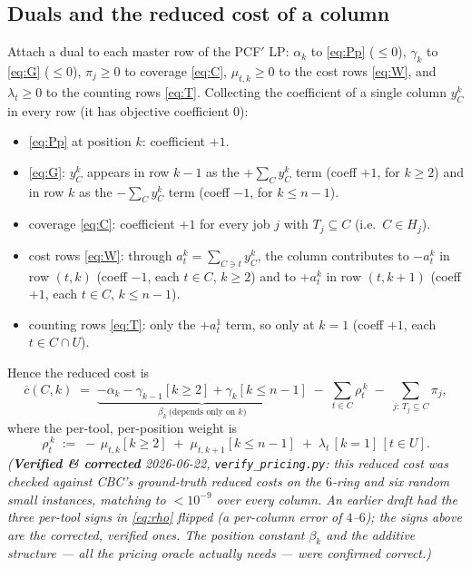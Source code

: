 \documentclass[11pt,a4paper]{article}
\theoremstyle{plain}
\theoremstyle{definition}
\newcommand{\RC}{\overline{c}}
\begin{document}
\subsection{Duals and the reduced cost of a column}
Attach a dual to each master row of the PCF$'$ LP: $\alpha_k$ to \eqref{eq:Pp} ($\le0$),
$\gamma_k$ to \eqref{eq:G} ($\le0$), $\pi_j\ge0$ to coverage \eqref{eq:C}, $\mu_{t,k}\ge0$ to the
cost rows \eqref{eq:W}, and $\lambda_t\ge0$ to the counting rows \eqref{eq:T}. Collecting the
coefficient of a single column $y_C^k$ in every row (it has objective coefficient $0$):
\begin{itemize}
\item \eqref{eq:Pp} at position $k$: coefficient $+1$.
\item \eqref{eq:G}: $y_C^k$ appears in row $k{-}1$ as the $+\sum_C y_C^k$ term (coeff $+1$, for
      $k\ge2$) and in row $k$ as the $-\sum_C y_C^k$ term (coeff $-1$, for $k\le n-1$).
\item coverage \eqref{eq:C}: coefficient $+1$ for every job $j$ with $T_j\subseteq C$ (i.e.\
      $C\in H_j$).
\item cost rows \eqref{eq:W}: through $a_t^k=\sum_{C\ni t}y_C^k$, the column contributes to
      $-a_t^k$ in row $(t,k)$ (coeff $-1$, each $t\in C$, $k\ge2$) and to $+a_t^{k}$ in row
      $(t,k{+}1)$ (coeff $+1$, each $t\in C$, $k\le n-1$).
\item counting rows \eqref{eq:T}: only the $+a_t^1$ term, so only at $k=1$ (coeff $+1$, each
      $t\in C\cap U$).
\end{itemize}
Hence the reduced cost is
\begin{equation}\label{eq:rc-pcf}
  \RC(C,k)\;=\;\underbrace{-\alpha_k-\gamma_{k-1}[k\ge2]+\gamma_k[k\le n-1]}_{\textstyle\beta_k\ \text{(depends only on }k)}
  \;-\;\sum_{t\in C}\rho_t^{\,k}\;-\;\sum_{j:\,T_j\subseteq C}\pi_j,
\end{equation}
where the per-tool, per-position weight is
\begin{equation}\label{eq:rho}
  \rho_t^{\,k}\;:=\;-\,\mu_{t,k}[k\ge2]\;+\;\mu_{t,k+1}[k\le n-1]\;+\;\lambda_t\,[k=1]\,[t\in U].
\end{equation}
\emph{(\textbf{Verified \& corrected} 2026-06-22, \texttt{verify\_pricing.py}: this reduced cost
was checked against CBC's ground-truth reduced costs on the $6$-ring and six random small
instances, matching to $<10^{-9}$ over every column. An earlier draft had the three per-tool
signs in \eqref{eq:rho} flipped (a per-column error of $4$--$6$); the signs above are the
corrected, verified ones. The position constant $\beta_k$ and the additive structure --- all the
pricing oracle actually needs --- were confirmed correct.)}
\end{document}
